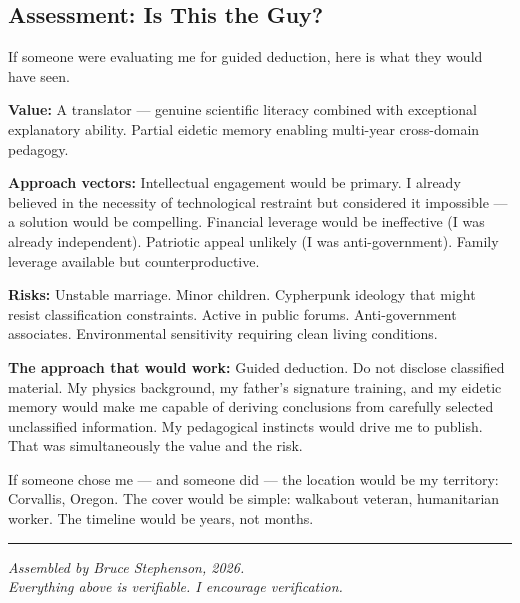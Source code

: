 \subsection*{Assessment: Is This the Guy?}
\label{record:tgt-recruitment-assessment}

If someone were evaluating me for guided deduction, here is what they would have seen.

\textbf{Value:} A translator --- genuine scientific literacy combined with exceptional explanatory ability. Partial eidetic memory enabling multi-year cross-domain pedagogy.

\textbf{Approach vectors:} Intellectual engagement would be primary. I already believed in the necessity of technological restraint but considered it impossible --- a solution would be compelling. Financial leverage would be ineffective (I was already independent). Patriotic appeal unlikely (I was anti-government). Family leverage available but counterproductive.

\textbf{Risks:} Unstable marriage. Minor children. Cypherpunk ideology that might resist classification constraints. Active in public forums. Anti-government associates. Environmental sensitivity requiring clean living conditions.

\textbf{The approach that would work:} Guided deduction. Do not disclose classified material. My physics background, my father's signature training, and my eidetic memory would make me capable of deriving conclusions from carefully selected unclassified information. My pedagogical instincts would drive me to publish. That was simultaneously the value and the risk.

If someone chose me --- and someone did --- the location would be my territory: Corvallis, Oregon. The cover would be simple: walkabout veteran, humanitarian worker. The timeline would be years, not months.

\vspace{1cm}\hrule\vspace{0.5cm}

\begin{flushright}\small\textit{%
Assembled by Bruce Stephenson, 2026.\\
Everything above is verifiable. I encourage verification.%
}\end{flushright}

\chapterreturn
